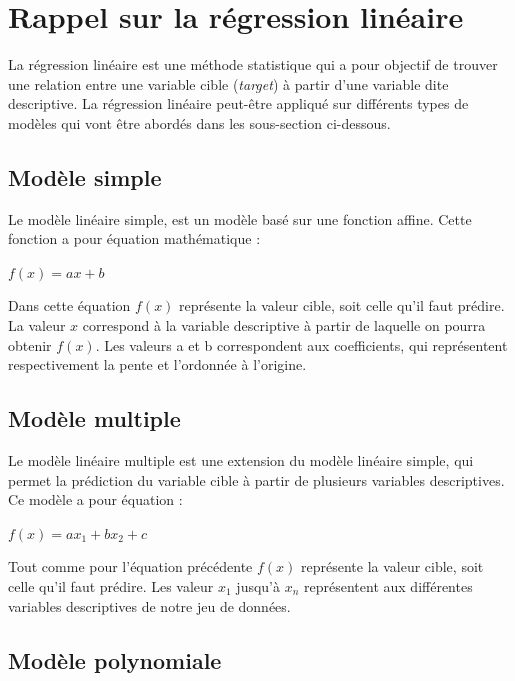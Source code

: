 \documentclass[french]{article}
\begin{document}
\newpage

\tableofcontents

\newpage

\section{Rappel sur la régression linéaire}

La régression linéaire est une méthode statistique qui a pour objectif de trouver une relation entre une variable cible (\textit{target}) à partir d'une variable dite descriptive. La régression linéaire peut-être appliqué sur différents types de modèles qui vont être abordés dans les sous-section ci-dessous. 

\subsection{Modèle simple}

Le modèle linéaire simple, est un modèle basé sur une fonction affine. Cette fonction a pour équation mathématique :

\begin{center}
    $f(x) = ax + b$
\end{center}

\noindent Dans cette équation $f(x)$ représente la valeur cible, soit celle qu'il faut prédire. La valeur $x$ correspond à la variable descriptive à partir de laquelle on pourra obtenir $f(x)$. Les valeurs a et b correspondent aux coefficients, qui représentent respectivement la pente et l'ordonnée à l'origine. 

\subsection{Modèle multiple}

Le modèle linéaire multiple est une extension du modèle linéaire simple, qui permet la prédiction du variable cible à partir de plusieurs variables descriptives. Ce modèle a pour équation :

\begin{center}
    $f(x) = ax_{1} + bx_{2} + c $
\end{center}

\noindent Tout comme pour l'équation précédente $f(x)$ représente la valeur cible, soit celle qu'il faut prédire. Les valeur $x_{1}$ jusqu'à $x_{n}$ représentent aux différentes variables descriptives de notre jeu de données.

\subsection{Modèle polynomiale}
\end{document}
